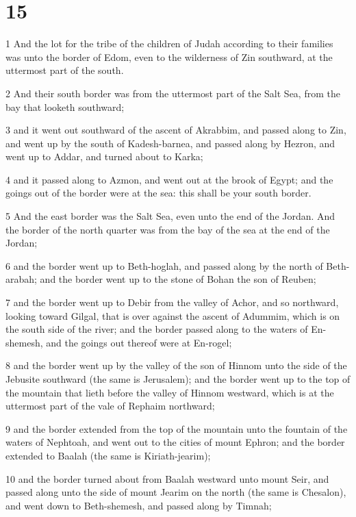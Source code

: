 \chapter{15}

\par 1 And the lot for the tribe of the children of Judah according to their families was unto the border of Edom, even to the wilderness of Zin southward, at the uttermost part of the south.
\par 2 And their south border was from the uttermost part of the Salt Sea, from the bay that looketh southward;
\par 3 and it went out southward of the ascent of Akrabbim, and passed along to Zin, and went up by the south of Kadesh-barnea, and passed along by Hezron, and went up to Addar, and turned about to Karka;
\par 4 and it passed along to Azmon, and went out at the brook of Egypt; and the goings out of the border were at the sea: this shall be your south border.
\par 5 And the east border was the Salt Sea, even unto the end of the Jordan. And the border of the north quarter was from the bay of the sea at the end of the Jordan;
\par 6 and the border went up to Beth-hoglah, and passed along by the north of Beth-arabah; and the border went up to the stone of Bohan the son of Reuben;
\par 7 and the border went up to Debir from the valley of Achor, and so northward, looking toward Gilgal, that is over against the ascent of Adummim, which is on the south side of the river; and the border passed along to the waters of En-shemesh, and the goings out thereof were at En-rogel;
\par 8 and the border went up by the valley of the son of Hinnom unto the side of the Jebusite southward (the same is Jerusalem); and the border went up to the top of the mountain that lieth before the valley of Hinnom westward, which is at the uttermost part of the vale of Rephaim northward;
\par 9 and the border extended from the top of the mountain unto the fountain of the waters of Nephtoah, and went out to the cities of mount Ephron; and the border extended to Baalah (the same is Kiriath-jearim);
\par 10 and the border turned about from Baalah westward unto mount Seir, and passed along unto the side of mount Jearim on the north (the same is Chesalon), and went down to Beth-shemesh, and passed along by Timnah;
